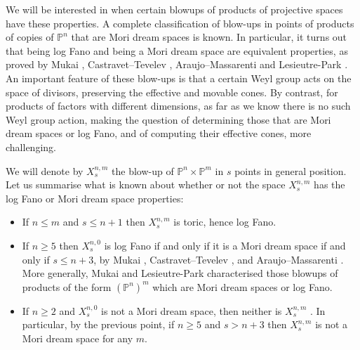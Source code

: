 \documentclass[a4paper,11pt]{article}
\newcommand{\PP}{\mathbb P}
\begin{document}
We will be interested in when certain blowups of products of projective spaces have these properties. A complete classification of blow-ups in points of products of copies of $\PP^n$ that are Mori dream spaces is known. In particular, it turns out that being log Fano and being a Mori dream space are equivalent properties, as proved  by Mukai \cite{Mukai05}, Castravet--Tevelev \cite{CT06}, Araujo--Massarenti \cite{AM16} and Lesieutre-Park \cite{LP17}. An important feature of these blow-ups is that a certain Weyl group acts on the space of divisors, preserving the effective and movable cones. By contrast, for products of factors with different dimensions, as far as we know there is no such Weyl group action, making the question of determining those that are Mori dream spaces or log Fano, and of computing their effective cones, more challenging. 

We will denote by $X^{n,m}_s$ the blow-up of $\PP^n\times\PP^m$ in $s$ points in general position.
 Let us summarise what is known about whether or not the space $X^{n,m}_s$ has the log Fano or Mori dream space properties:
 \begin{itemize}
 \item If $n \leq m$ and $s \leq n+1$ then $X^{n,m}_s$ is toric, hence log Fano.
 \item If $n \geq 5$ then $X^{n,0}_s$ is log Fano if and only if it is a Mori dream space if and only if $s \leq n+3$, by Mukai \cite{Mukai05}, Castravet--Tevelev \cite{CT06}, and Araujo--Massarenti \cite{AM16}. More generally, Mukai \cite{Mukai05} and Lesieutre-Park \cite{LP17} characterised those blowups of products of the form $(\PP^n)^m$ which are Mori dream spaces or log Fano.
 \item If $n \geq2$ and $X^{n,0}_s$ is not a Mori dream space, then neither is $X^{n,m}_s$ \cite[Corollary 6.9]{GPP21}. In particular, by the previous point, if $n \geq 5$ and $s>n+3$ then $X^{n,m}_s$ is not a Mori dream space for any $m$. 
  \end{itemize}
\end{document}
